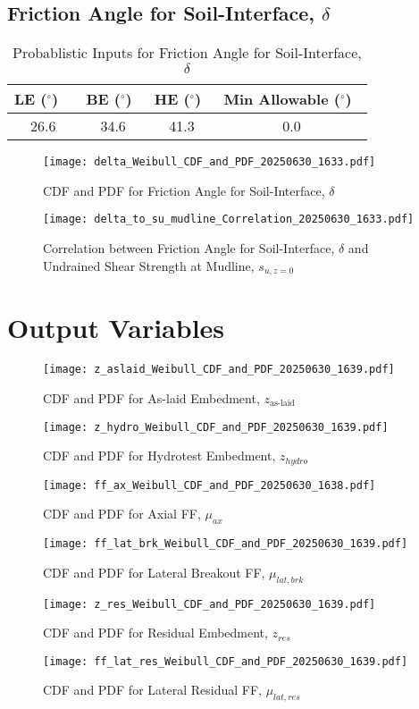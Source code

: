 \documentclass{article}
\begin{document}
\subsection*{Friction Angle for Soil-Interface, $\delta$}
\begin{table}[h!]
\centering
\caption{Probablistic Inputs for Friction Angle for Soil-Interface, $\delta$}
\begin{tabular}{|c|c|c|c|}
\hline
LE ($^\circ$) \ & BE ($^\circ$)\ & HE ($^\circ$)\ & Min Allowable ($^\circ$)\ \\
\hline
26.6 & 34.6 & 41.3 & 0.0 \\
\hline
\end{tabular}
\end{table}
\begin{figure}[h!]
\centering
\texttt{[image: delta\_Weibull\_CDF\_and\_PDF\_20250630\_1633.pdf]}
\caption{CDF and PDF for Friction Angle for Soil-Interface, $\delta$}
\end{figure}
\begin{figure}[h!]
\centering
\texttt{[image: delta\_to\_su\_mudline\_Correlation\_20250630\_1633.pdf]}
\caption{Correlation between Friction Angle for Soil-Interface, $\delta$ and Undrained Shear Strength at Mudline, $s_{{u,z=0}}$}
\end{figure}
\clearpage
\clearpage
\section*{Output Variables}

\begin{figure}[h!]
\centering
\texttt{[image: z\_aslaid\_Weibull\_CDF\_and\_PDF\_20250630\_1639.pdf]}
\caption{CDF and PDF for As-laid Embedment, $z_{\text{as-laid}}$}
\end{figure}
\begin{figure}[h!]
\centering
\texttt{[image: z\_hydro\_Weibull\_CDF\_and\_PDF\_20250630\_1639.pdf]}
\caption{CDF and PDF for Hydrotest Embedment, $z_{hydro}$}
\end{figure}
\begin{figure}[h!]
\centering
\texttt{[image: ff\_ax\_Weibull\_CDF\_and\_PDF\_20250630\_1638.pdf]}
\caption{CDF and PDF for Axial FF, $\mu_{{ax}}$}
\end{figure}
\begin{figure}[h!]
\centering
\texttt{[image: ff\_lat\_brk\_Weibull\_CDF\_and\_PDF\_20250630\_1639.pdf]}
\caption{CDF and PDF for Lateral Breakout FF, $\mu_{{lat,brk}}$}
\end{figure}
\begin{figure}[h!]
\centering
\texttt{[image: z\_res\_Weibull\_CDF\_and\_PDF\_20250630\_1639.pdf]}
\caption{CDF and PDF for Residual Embedment, $z_{res}$}
\end{figure}
\begin{figure}[h!]
\centering
\texttt{[image: ff\_lat\_res\_Weibull\_CDF\_and\_PDF\_20250630\_1639.pdf]}
\caption{CDF and PDF for Lateral Residual FF, $\mu_{{lat,res}}$}
\end{figure}
\end{document}
